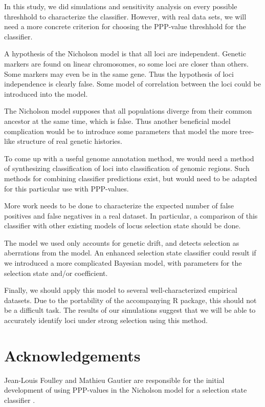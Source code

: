 \documentclass[a4paper,12pt]{article}
\begin{document}
In this study, we did simulations and sensitivity analysis on every
possible threshhold to characterize the classifier. However, with real
data sets, we will need a more concrete criterion for choosing the
PPP-value threshhold for the classifier.

A hypothesis of the Nicholson model is that all loci are
independent. Genetic markers are found on linear chromosomes, so some
loci are closer than others. Some markers may even be in the same
gene. Thus the hypothesis of loci independence is clearly false. Some
model of correlation between the loci could be introduced into the
model.

The Nicholson model supposes that all populations diverge from their
common ancestor at the same time, which is false. Thus another
beneficial model complication would be to introduce some parameters
that model the more tree-like structure of real genetic histories.

To come up with a useful genome annotation method, we would need a
method of synthesizing classification of loci into classification of
genomic regions. Such methods for combining classifier predictions
exist, but would need to be adapted for this particular use with
PPP-values.

More work needs to be done to characterize the expected number of
false positives and false negatives in a real dataset. In particular,
a comparison of this classifier with other existing models of locus
selection state should be done.

The model we used only accounts for genetic drift, and detects
selection as aberrations from the model. An enhanced selection state
classifier could result if we introduced a more complicated Bayesian
model, with parameters for the selection state and/or coefficient.

Finally, we should apply this model to several well-characterized
empirical datasets. Due to the portability of the accompanying R
package, this should not be a difficult task. The results of our
simulations suggest that we will be able to accurately identify loci
under strong selection using this method.

\section{Acknowledgements}

Jean-Louis Foulley and Mathieu Gautier are responsible for the initial
development of using PPP-values in the Nicholson model for a selection
state classifier \cite{foulley-gautier}.
\end{document}
